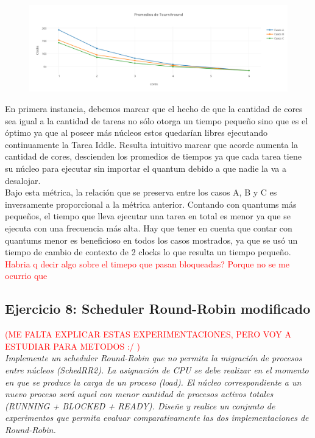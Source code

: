 \documentclass[a4paper]{article}
\begin{document}
 		 \begin{figure}[h!]
   \begin{center}
 	\includegraphics[scale=1.2]{imagenes/ej7/TiemposTournAround.png}
   \end{center}
 \end{figure} 
 
En primera instancia, debemos marcar que el hecho de que la cantidad de cores sea igual a la cantidad de tareas no s\'olo otorga un tiempo peque\~no sino que es el \'optimo ya que al poseer m\'as n\'ucleos estos quedar\'ian libres ejecutando continuamente la Tarea Iddle. Resulta intuitivo marcar que acorde aumenta la cantidad de cores, descienden los promedios de tiempos ya que cada tarea tiene su n\'ucleo para ejecutar sin importar el quantum debido a que nadie la va a desalojar.\\


Bajo esta m\'etrica, la relaci\'on que se preserva entre los casos A, B y C es inversamente proporcional a la m\'etrica anterior. Contando con quantums m\'as peque\~nos, el tiempo que lleva ejecutar una tarea en total es menor ya que se ejecuta con una frecuencia m\'as alta. Hay que tener en cuenta que contar con quantums menor es beneficioso en todos los casos mostrados, ya que se us\'o un tiempo de cambio de contexto de 2 clocks lo que resulta un tiempo peque\~no.\\

\textcolor{red}{Habria q decir algo sobre el timepo que pasan bloqueadas? Porque no se me ocurrio que}
 
 \newpage
 \subsection{Ejercicio 8: Scheduler Round-Robin modificado}
 
\textcolor{red}{(ME FALTA EXPLICAR ESTAS EXPERIMENTACIONES, PERO VOY A ESTUDIAR PARA METODOS :/ )} \\
 
\textit{Implemente un scheduler Round-Robin que no permita la migraci\'on de procesos entre n\'ucleos (SchedRR2). La asignaci\'on de CPU se debe realizar en el momento en que se produce la carga de un proceso (load). El n\'ucleo correspondiente a un nuevo proceso ser\'a aquel con menor cantidad de procesos activos totales (RUNNING + BLOCKED + READY). Dise\~ne y realice un conjunto de experimentos que permita evaluar comparativamente las dos implementaciones de Round-Robin.}\\
\end{document}
